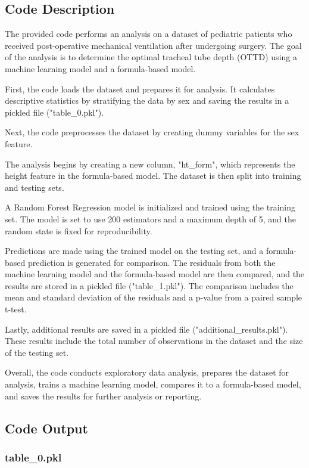 \documentclass[11pt]{article}
\begin{document}
\subsection{Code Description}

The provided code performs an analysis on a dataset of pediatric patients who received post-operative mechanical ventilation after undergoing surgery. The goal of the analysis is to determine the optimal tracheal tube depth (OTTD) using a machine learning model and a formula-based model.

First, the code loads the dataset and prepares it for analysis. It calculates descriptive statistics by stratifying the data by sex and saving the results in a pickled file ("table\_0.pkl").

Next, the code preprocesses the dataset by creating dummy variables for the sex feature.

The analysis begins by creating a new column, "ht\_form", which represents the height feature in the formula-based model. The dataset is then split into training and testing sets.

A Random Forest Regression model is initialized and trained using the training set. The model is set to use 200 estimators and a maximum depth of 5, and the random state is fixed for reproducibility.

Predictions are made using the trained model on the testing set, and a formula-based prediction is generated for comparison. The residuals from both the machine learning model and the formula-based model are then compared, and the results are stored in a pickled file ("table\_1.pkl"). The comparison includes the mean and standard deviation of the residuals and a p-value from a paired sample t-test.

Lastly, additional results are saved in a pickled file ("additional\_results.pkl"). These results include the total number of observations in the dataset and the size of the testing set.

Overall, the code conducts exploratory data analysis, prepares the dataset for analysis, trains a machine learning model, compares it to a formula-based model, and saves the results for further analysis or reporting.

\subsection{Code Output}

\subsubsection*{table\_0.pkl}
\end{document}
